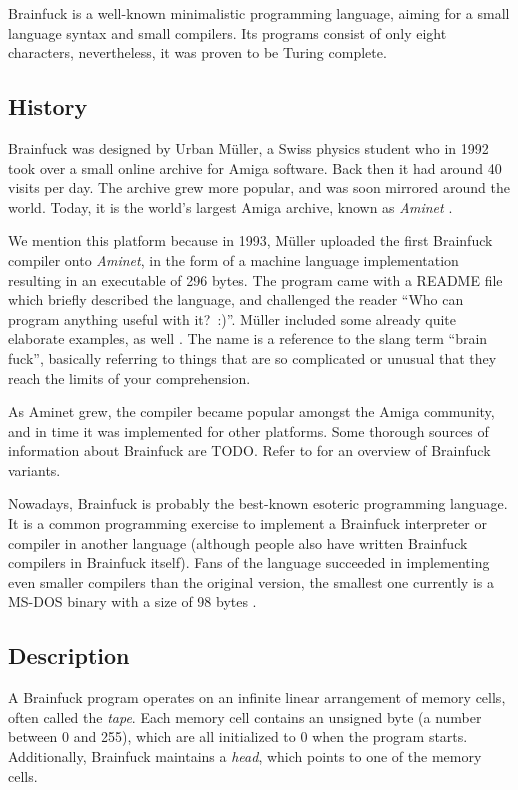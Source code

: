 Brainfuck is a well-known minimalistic programming language, aiming for a small language syntax and small compilers. Its programs consist of only eight characters, nevertheless, it was proven to be Turing complete.

\subsection{History}

Brainfuck was designed by Urban Müller, a Swiss physics student who in 1992 took over a small online archive for Amiga software. Back then it had around 40 visits per day. The archive grew more popular, and was soon mirrored around the world. Today, it is the world's largest Amiga archive, known as \emph{Aminet} \cite{muller1993aminet}.

We mention this platform because in 1993, Müller uploaded the first Brainfuck compiler onto \emph{Aminet}, in the form of a machine language implementation resulting in an executable of 296 bytes. The program came with a README file which briefly described the language, and challenged the reader “Who can program anything useful with it?~:)”. Müller included some already quite elaborate examples, as well \cite{muller1993240}. The name is a reference to the slang term “brain fuck”, basically referring to things that are so complicated or unusual that they reach the limits of your comprehension.

As Aminet grew, the compiler became popular amongst the Amiga community, and in time it was implemented for other platforms. Some thorough sources of information about Brainfuck are TODO. Refer to  for an overview of Brainfuck variants.

Nowadays, Brainfuck is probably the best-known esoteric programming language. It is a common programming exercise to implement a Brainfuck interpreter or compiler in another language (although people also have written Brainfuck compilers in Brainfuck itself). Fans of the language succeeded in implementing even smaller compilers than the original version, the smallest one currently is a MS-DOS binary with a size of 98 bytes \cite{inte1999entry}.

\subsection{Description}

A Brainfuck program operates on an infinite linear arrangement of memory cells, often called the \emph{tape}. Each memory cell contains an unsigned byte (a number between 0 and 255), which are all initialized to 0 when the program starts. Additionally, Brainfuck maintains a \emph{head}, which points to one of the memory cells.

